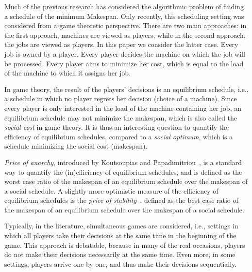 \documentclass[12pt,a4paper]{article}
\theoremstyle{definition}
\theoremstyle{remark}
\begin{document}
Much of the previous research has considered the algorithmic problem of finding a schedule of the minimum Makespan.
%
Only recently, this scheduling setting was considered from a game theoretic perspective. There are two main approaches: in the first approach, machines are viewed as players, while in the second approach, the jobs are viewed as players. 
%
In this paper we consider the latter case. 
%
%
Every job is owned by a player. Every player decides the machine on which the job will be processed. 
%
Every player aims to minimize her cost, which is equal to the load of the machine to which it assigns her job.
%

In game theory, the result of the players' decisions is an equilibrium schedule, i.e., a schedule in which no player regrets her decision (choice of a machine). 
%
Since every player is only interested in the load of the machine containing her job, an equilibrium schedule may not minimize the makespan, which is also called the \emph{social cost} in game theory. 
%
It is thus an interesting question to quantify the efficiency of equilibrium schedules, compared to a \emph{social optimum}, which is a schedule minimizing the social cost (makespan).


\emph{Price of anarchy}, introduced by Koutsoupias and Papadimitriou~\cite{PoAoriginal}, is a standard way to quantify the (in)efficiency of equilibrium schedules, and is defined as the worst case ratio of the makespan of an equilibrium schedule over the makespan of a social schedule.
%
A slightly more optimistic measure of the efficiency of equilibrium schedules is the \emph{price of stability}~\cite{PoSoriginal}, defined as the best case ratio of the makespan of an equilibrium schedule over the makespan of a social schedule.
%

Typically, in the literature, simultaneous games are considered, i.e., settings in which all players take their decisions at the same time in the beginning of the game. 
%
This approach is debatable, because in many of the real occasions, players do not make their decisions necessarily at the same time. Even more, in some settings, players arrive one by one, and thus make their decisions sequentially.
%
\end{document}
